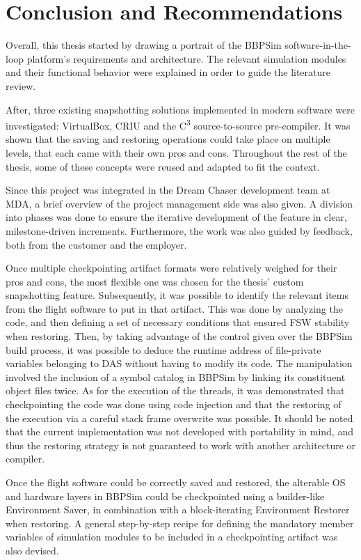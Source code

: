 \chapter{Conclusion and Recommendations}\label{cha:conclusion}
Overall, this thesis started by drawing a portrait of the \gls{BBPSim} software-in-the-loop platform's requirements and architecture. The relevant simulation modules and their functional behavior were explained in order to guide the literature review. 

After, three existing snapshotting solutions implemented in modern software were investigated: VirtualBox, \gls{CRIU} and the C\textsuperscript{3} source-to-source pre-compiler. It was shown that the saving and restoring operations could take place on multiple levels, that each came with their own pros and cons. Throughout the rest of the thesis, some of these concepts were reused and adapted to fit the context.

Since this project was integrated in the Dream Chaser development team at \gls{MDA}, a brief overview of the project management side was also given. A division into phases was done to ensure the iterative development of the feature in clear, milestone-driven increments. Furthermore, the work was also guided by feedback, both from the customer and the employer.

Once multiple checkpointing artifact formats were relatively weighed for their pros and cons, the most flexible one was chosen for the thesis' custom snapshotting feature. Subsequently, it was possible to identify the relevant items from the flight software to put in that artifact. This was done by analyzing the code, and then defining a set of necessary conditions that ensured FSW stability when restoring. Then, by taking advantage of the control given over the BBPSim build process, it was possible to deduce the runtime address of file-private variables belonging to DAS without having to modify its code. The manipulation involved the inclusion of a symbol catalog in BBPSim by linking its constituent object files twice. As for the execution of the threads, it was demonstrated that checkpointing the code was done using code injection and that the restoring of the execution via a careful stack frame overwrite was possible. It should be noted that the current implementation was not developed with portability in mind, and thus the restoring strategy is not guaranteed to work with another architecture or compiler.

Once the flight software could be correctly saved and restored, the alterable OS and hardware layers in BBPSim could be checkpointed using a builder-like Environment Saver, in combination with a block-iterating Environment Restorer when restoring. A general step-by-step recipe for defining the mandatory member variables of simulation modules to be included in a checkpointing artifact was also devised. 

